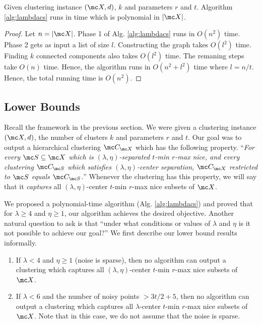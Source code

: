 \documentclass[11pt]{article}
\begin{document}
\begin{theorem}
Given clustering instance $(\mc X, d)$, $k$ and parameters $r$ and $t$. Algorithm \ref{alg:lambdacs} runs in time which is polynomial in $|\mc X|$.
\end{theorem}

\begin{proof}
Let $n = |\mc X|$. Phase 1 of Alg. \ref{alg:lambdacs} runs in $O(n^2)$ time. Phase 2 gets as input a list of size $l$. Constructing the graph takes $O(l^2)$ time. Finding $k$ connected components also takes $O(l^2)$ time. The remaning steps take $O(n)$ time. Hence, the algorithm runs in $O(n^2 + l^2)$ time where $l = n/t$. Hence, the total running time is $O(n^2)$.
\end{proof}

\subsection{Lower Bounds}
Recall the framework in the previous section. We were given a clustering instance $(\mc X, d)$, the number of clusters $k$ and parameters $r$ and $t$. Our goal was to output a hierarchical clustering $\mc C_{\mc X}$ which has the following property. ``{\it For every $\mc S \subseteq \mc X$ which is $(\lambda, \eta)$-separated $t$-min $r$-max nice, and every clustering $\mc C_{\mc S}$ which satisfies $(\lambda, \eta)$-center separation, $\mc C_{\mc X}$ restricted to $\mc S$ equals $\mc C_{\mc S}$.}'' Whenever the clustering has this property, we will say that it {\it captures} all $(\lambda, \eta)$-center $t$-min $r$-max nice subsets of $\mc X$.

We proposed a polynomial-time algorithm (Alg. \ref{alg:lambdacs}) and proved that for $\lambda \ge 4$ and $\eta \ge 1$, our algorithm achieves the desired objective. Another natural question to ask is that ``under what conditions or values of $\lambda$ and $\eta$ is it not possible to achieve our goal?'' We first describe our lower bound results informally.

\begin{enumerate}[nolistsep, noitemsep, label=\textbf{L.\arabic*}]
\renewcommand\labelitemi{$\diamond$}
\item \label{lowerBd:lambdacs1} If $\lambda < 4$ and $\eta \ge 1$ (noise is sparse), then no algorithm can output a clustering which captures all $(\lambda, \eta)$-center $t$-min $r$-max nice subsets of $\mc X$.
\item \label{lowerBd:lambdacs2} If $\lambda < 6$ and the number of noisy points $ > 3t/2+5$, then no algorithm can output a clustering which captures all $\lambda$-center $t$-min $r$-max nice subsets of $\mc X$. Note that in this case, we do not assume that the noise is sparse.
\end{enumerate}
\end{document}
